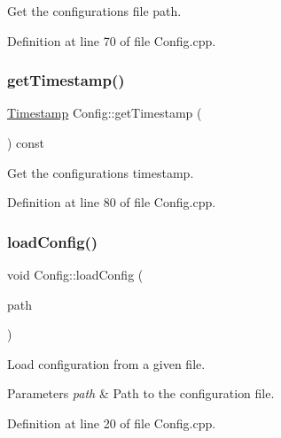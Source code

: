 Get the configuration\textquotesingle{}s file path. 



Definition at line 70 of file Config.\+cpp.

\mbox{\label{classcfg_1_1_config_acbd974221e2b58f235b596ec3a52c44c}} 
\subsubsection{\texorpdfstring{get\+Timestamp()}{getTimestamp()}}
{\footnotesize\ttfamily \hyperlink{namespacecfg_aa17d58439174a5af7fb3f37a3cdd6d0b}{Timestamp} Config\+::get\+Timestamp (\begin{DoxyParamCaption}{ }\end{DoxyParamCaption}) const\hspace{0.3cm}{\ttfamily [noexcept]}}



Get the configuration\textquotesingle{}s timestamp. 



Definition at line 80 of file Config.\+cpp.

\mbox{\label{classcfg_1_1_config_a8c2a84783775b02046041628d74be6e7}} 
\subsubsection{\texorpdfstring{load\+Config()}{loadConfig()}}
{\footnotesize\ttfamily void Config\+::load\+Config (\begin{DoxyParamCaption}\item[{const std\+::filesystem\+::path \&}]{path }\end{DoxyParamCaption})}



Load configuration from a given file. 


\begin{DoxyParams}{Parameters}
{\em path} & Path to the configuration file. \\
\hline
\end{DoxyParams}


Definition at line 20 of file Config.\+cpp.

